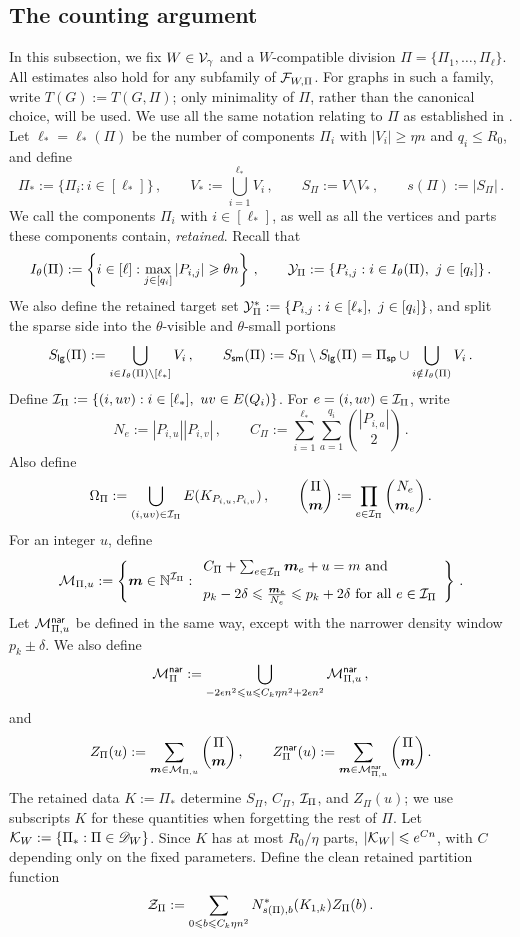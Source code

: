 \subsection{The counting argument}\label{subsec:counting}
In this subsection, we fix $W\in{\mathcal V}_\gamma$ and a $W$-compatible division $\Pi=\{\Pi_1,\dots,\Pi_\ell\}$. All estimates also hold for any subfamily of ${\mathcal F}_{W,\Pi}$. For graphs in such a family, write $T(G):=T(G,\Pi)$; only minimality of $\Pi$, rather than the canonical choice, will be used. We use all the same notation relating to $\Pi$ as established in . Let $\ell_\ast=\ell_\ast(\Pi)$ be the number of components $\Pi_i$ with $|V_i|\geq \eta n$ and $q_i\leq R_0$, and define
$$\Pi_\ast:=\{\Pi_i:i\in[\ell_\ast]\}\,,\qquad V_\ast:=\bigcup_{i=1}^{\ell_\ast}V_i\,,\qquad S_\Pi:=V\setminus V_\ast\,,\qquad s(\Pi):=|S_\Pi|\,.$$
We call the components $\Pi_i$ with $i\in[\ell_\ast]$, as well as all the vertices and parts these components contain, \emph{retained}. Recall that
$$I_\theta(\Pi):=\left\{i\in[\ell]:\max_{j\in[q_i]}|P_{i,j}|\geq\theta n\right\}\,,\qquad \cY_\Pi:=\{P_{i,j}:i\in I_\theta(\Pi),\ j\in[q_i]\}\,.$$
We also define the retained target set $\cY^\ast_\Pi:=\{P_{i,j}:i\in[\ell_\ast],\ j\in[q_i]\}$,
and split the sparse side into the $\theta$-visible and $\theta$-small portions
$$S_{\mathsf{lg}}(\Pi):=\bigcup_{i\in I_\theta(\Pi)\setminus[\ell_\ast]}V_i\,,\qquad S_{\mathsf{sm}}(\Pi):=S_\Pi\setminus S_{\mathsf{lg}}(\Pi)=\Pi_{\mathsf{sp}}\cup\bigcup_{i\notin I_\theta(\Pi)}V_i\,.$$
Define ${\mathcal I}_\Pi:=\{(i,uv):i\in[\ell_\ast],\ uv\in E(Q_i)\}$.
For $e=(i,uv)\in{\mathcal I}_\Pi$, write
$$N_e:=|P_{i,u}||P_{i,v}|\,,\qquad C_\Pi:=\sum_{i=1}^{\ell_\ast}\sum_{a=1}^{q_i}\binom{|P_{i,a}|}{2}\,.$$
Also define
$$\Omega_\Pi:=\bigcup_{(i,uv)\in{\mathcal I}_\Pi}E(K_{P_{i,u},P_{i,v}})\,,\qquad \binom{\Pi}{\boldsymbol{m}}:=\prod_{e\in{\mathcal I}_\Pi}\binom{N_e}{\boldsymbol{m}_e}\,.$$
For an integer $u$, define
$${\mathcal M}_{\Pi,u} := \left\{\boldsymbol{m}\in{\mathbb N}^{{\mathcal I}_\Pi}:
\begin{array}{l}
C_\Pi+\sum_{e\in{\mathcal I}_\Pi}\boldsymbol{m}_e+u=m\text{ and} \\[8pt]
p_k-2\delta\leqslant \frac{\boldsymbol{m}_e}{N_e}\leqslant p_k+2\delta\text{ for all }e\in{\mathcal I}_\Pi
\end{array}\right\}\,.$$
Let ${\mathcal M}^{\mathsf{nar}}_{\Pi,u}$ be defined in the same way, except with the narrower density window $p_k\pm\delta$. We also define
$${\mathcal M}^{\mathsf{nar}}_\Pi:=\bigcup_{-2\epsilon n^2\leqslant u\leqslant C_k\eta n^2+2\epsilon n^2}{\mathcal M}^{\mathsf{nar}}_{\Pi,u}\,,$$
and
$$Z_\Pi(u):=\sum_{\boldsymbol{m}\in{\mathcal M}_{\Pi,u}}\binom{\Pi}{\boldsymbol{m}}\,,\qquad Z^{\mathsf{nar}}_\Pi(u):=\sum_{\boldsymbol{m}\in{\mathcal M}^{\mathsf{nar}}_{\Pi,u}}\binom{\Pi}{\boldsymbol{m}}\,.$$
The retained data $K:=\Pi_\ast$ determine $S_\Pi$, $C_\Pi$, ${\mathcal I}_\Pi$, and $Z_\Pi(u)$; we use subscripts $K$ for these quantities when forgetting the rest of $\Pi$. Let ${\mathcal K}_W:=\{\Pi_\ast:\Pi\in{\mathscr D}_W\}$. Since $K$ has at most $R_0/\eta$ parts, $|{\mathcal K}_W|\leqslant e^{Cn}$, with $C$ depending only on the fixed parameters. Define the clean retained partition function
\begin{equation}\label{eqn:clean-partition-function-K1k}
{\mathcal Z}_\Pi:=\sum_{0\leqslant b\leqslant C_k\eta n^2}N^\ast_{s(\Pi),b}(K_{1,k})Z_\Pi(b)\,.
\end{equation}

